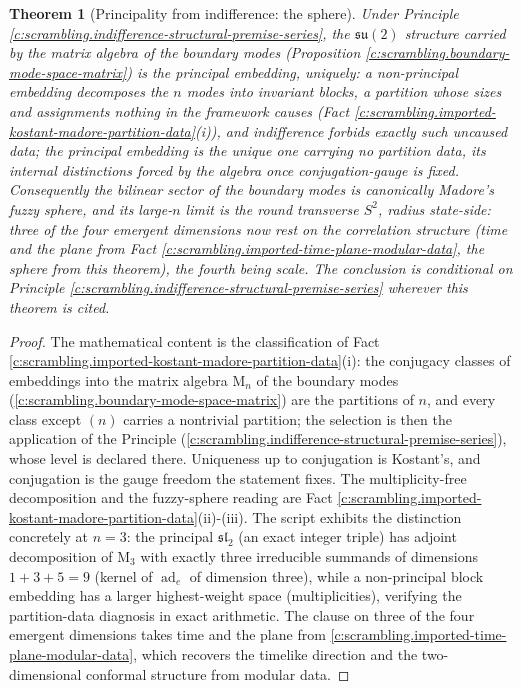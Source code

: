 \documentclass[11pt]{article}
\newtheorem{theorem}{Theorem}[section]
\theoremstyle{definition}
\theoremstyle{plain}
\newcommand{\changedmark}[2]{\marginpar{\raggedright\scriptsize\color{#1}#2}}
\providecommand{\Mat}{}\renewcommand{\Mat}{\mathrm{M}}
\begin{document}
\begin{theorem}[Principality from indifference: the sphere]\label{c:scrambling.principality-indifference-sphere}
\changedmark{gray}{reworded}
Under Principle \ref{c:scrambling.indifference-structural-premise-series}, the $\mathfrak{su}(2)$ structure carried by the matrix algebra of the boundary modes (Proposition \ref{c:scrambling.boundary-mode-space-matrix}) is the principal embedding, uniquely: a non-principal embedding decomposes the $n$ modes into invariant blocks, a partition whose sizes and assignments nothing in the framework causes (Fact \ref{c:scrambling.imported-kostant-madore-partition-data}(i)), and indifference forbids exactly such uncaused data; the principal embedding is the unique one carrying no partition data, its internal distinctions forced by the algebra once conjugation-gauge is fixed. Consequently the bilinear sector of the boundary modes is canonically Madore's fuzzy sphere, and its large-$n$ limit is the round transverse $S^2$, radius state-side: three of the four emergent dimensions now rest on the correlation structure (time and the plane from Fact \ref{c:scrambling.imported-time-plane-modular-data}, the sphere from this theorem), the fourth being scale. The conclusion is conditional on Principle \ref{c:scrambling.indifference-structural-premise-series} wherever this theorem is cited.
\end{theorem}
\begin{proof}
The mathematical content is the classification of Fact \ref{c:scrambling.imported-kostant-madore-partition-data}(i): the conjugacy classes of embeddings into the matrix algebra $\Mat_n$ of the boundary modes (\ref{c:scrambling.boundary-mode-space-matrix}) are the partitions of $n$, and every class except $(n)$ carries a nontrivial partition; the selection is then the application of the Principle (\ref{c:scrambling.indifference-structural-premise-series}), whose level is declared there. Uniqueness up to conjugation is Kostant's, and conjugation is the gauge freedom the statement fixes. The multiplicity-free decomposition and the fuzzy-sphere reading are Fact \ref{c:scrambling.imported-kostant-madore-partition-data}(ii)-(iii). The script exhibits the distinction concretely at $n = 3$: the principal $\mathfrak{sl}_2$ (an exact integer triple) has adjoint decomposition of $\Mat_3$ with exactly three irreducible summands of dimensions $1 + 3 + 5 = 9$ (kernel of $\operatorname{ad}_e$ of dimension three), while a non-principal block embedding has a larger highest-weight space (multiplicities), verifying the partition-data diagnosis in exact arithmetic. The clause on three of the four emergent dimensions takes time and the plane from \ref{c:scrambling.imported-time-plane-modular-data}, which recovers the timelike direction and the two-dimensional conformal structure from modular data.

\end{proof}
\end{document}
